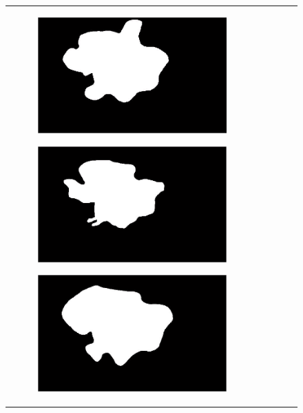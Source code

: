 \documentclass[a4paper, 10pt, conference]{ieeeconf}        %
\begin{document}
\begin{figure}[ht!]
\begin{tabular}{c c c c c}
\begin{subfigure}{0.2\textwidth}
   \end{subfigure}
   \begin{subfigure}{0.2\textwidth}
   \includegraphics[scale=0.2]{expert_1GroundTrue_02.JPG}
   \end{subfigure}
   \begin{subfigure}{0.2\textwidth}
    \includegraphics[scale=0.2]{expert_2GroundTrue_02.JPG}
    \end{subfigure} 
   \begin{subfigure}{0.2\textwidth}
    \includegraphics[scale=0.2]{expert_3GroundTrue_02.JPG}

\end{subfigure}
\end{tabular}
\end{figure}
\end{document}
